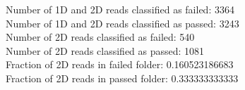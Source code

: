 Number of 1D and 2D reads classified as failed: 3364\\
Number of 1D and 2D reads classified as passed: 3243\\
Number of 2D reads classified as failed: 540\\
Number of 2D reads classified as passed: 1081\\
Fraction of 2D reads in failed folder: 0.160523186683\\
Fraction of 2D reads in passed folder: 0.333333333333\\
